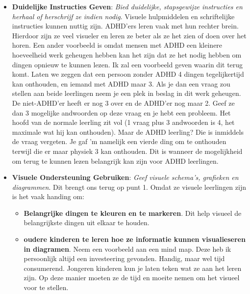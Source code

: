 \documentclass{article}
\begin{document}
                \begin{itemize}
                    \item \textbf{Duidelijke Instructies Geven}: 
                        \textit{Bied duidelijke, stapsgewijze instructies en herhaal of herschrijf ze indien nodig}. Visuele hulpmiddelen en schriftelijke instructies kunnen nuttig zijn\cite{ADHD-visual}. ADHD'ers leren vaak met hun rechter brein. Hierdoor zijn ze veel visueler en leren ze beter als ze het zien of doen over het horen. Een ander voorbeeld is omdat mensen met ADHD een kleinere hoeveelheid werk geheugen hebben kan het zijn dat ze het nodig hebben om dingen opnieuw te kunnen lezen. Ik zal een voorbeeld geven waarin dit terug komt. 
                        \smallskip
                        Laten we zeggen dat een persoon zonder ADHD 4 dingen tegelijkertijd kan onthouden, en iemand met ADHD maar 3. Als je dan een vraag zou stellen aan beide leerlingen neem je een plek in beslag in dit werk geheugen. De niet-ADHD'er heeft er nog 3 over en de ADHD'er nog maar 2. Geef ze dan 3 mogelijke andwoorden op deze vraag en je hebt een probleem. Het hoofd van de normale leerling zit vol (1 vraag plus 3 andwoorden is 4, het maximale wat hij kan onthouden). Maar de ADHD leerling? Die is inmiddels de vraag vergeten. Je gaf 'm namelijk een vierde ding om te onthouden terwijl die er maar physiek 3 kan onthouden. Dit is wanneer de mogelijkheid om terug te kunnen lezen belangrijk kan zijn voor ADHD leerlingen.\cite{ADHD-video-working-memory}
                    \item \textbf{Visuele Ondersteuning Gebruiken}: 
                        \textit{Geef visuele schema's, grafieken en diagrammen}. Dit brengt ons terug op punt 1. Omdat ze visuele leerlingen zijn is het vaak handing om: 
                        \begin{itemize}
                            \item \textbf{Belangrijke dingen te kleuren en te markeren}. 
                                Dit help visueel de belangrijkste dingen uit elkaar te houden.
                            \item \textbf{oudere kinderen te leren hoe ze informatie kunnen visualieseren in diagramen}. 
                                Neem een voorbeeld aan een mind map. Deze heb ik persoonlijk altijd een investeering gevonden. Handig, maar wel tijd consumerend. Jongeren kinderen kun je laten teken wat ze aan het leren zijn. Op deze manier moeten ze de tijd en moeite nemen om het visueel voor te stellen. 
                        \end{itemize}

\end{itemize}
\end{document}
